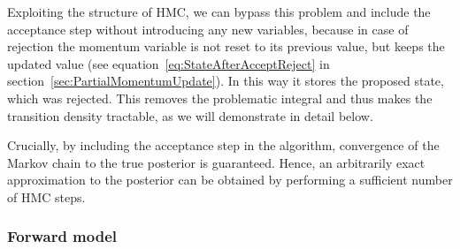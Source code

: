 Exploiting the structure of HMC, we can bypass this problem and include the acceptance step without introducing any new variables, because in case of rejection the momentum variable is not reset to its previous value, but keeps the updated value (see equation~\eqref{eq:StateAfterAcceptReject} in section~\ref{sec:PartialMomentumUpdate}). In this way it stores the proposed state, which was rejected. This removes the problematic integral and thus makes the transition density tractable, as we will demonstrate in detail below.

Crucially, by including the acceptance step in the algorithm, convergence of the Markov chain to the true posterior is guaranteed. Hence, an arbitrarily exact approximation to the posterior can be obtained by performing a sufficient number of HMC steps.

\subsubsection{Forward model}

